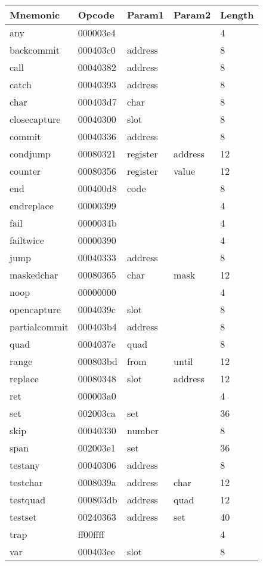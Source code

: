 
\begin{center}
\caption{Naigama Bytecode Instructions}
\label{tab:naig_bytecode}
\begin{longtable}{lllll}
\textbf{Mnemonic} & \textbf{Opcode} & \textbf{Param1} & \textbf{Param2} & \textbf{Length} \\
\endhead
any & 000003e4 &  &   & 4 \\
backcommit & 000403c0 & address &   & 8 \\
call & 00040382 & address &   & 8 \\
catch & 00040393 & address &   & 8 \\
char & 000403d7 & char &   & 8 \\
closecapture & 00040300 & slot &   & 8 \\
commit & 00040336 & address &   & 8 \\
condjump & 00080321 & register & address  & 12 \\
counter & 00080356 & register & value  & 12 \\
end & 000400d8 & code &   & 8 \\
endreplace & 00000399 &  &   & 4 \\
fail & 0000034b &  &   & 4 \\
failtwice & 00000390 &  &   & 4 \\
jump & 00040333 & address &   & 8 \\
maskedchar & 00080365 & char & mask  & 12 \\
noop & 00000000 &  &   & 4 \\
opencapture & 0004039c & slot &   & 8 \\
partialcommit & 000403b4 & address &   & 8 \\
quad & 0004037e & quad &   & 8 \\
range & 000803bd & from & until  & 12 \\
replace & 00080348 & slot & address  & 12 \\
ret & 000003a0 &  &   & 4 \\
set & 002003ca & set &   & 36 \\
skip & 00040330 & number &   & 8 \\
span & 002003e1 & set &   & 36 \\
testany & 00040306 & address &   & 8 \\
testchar & 0008039a & address & char  & 12 \\
testquad & 000803db & address & quad  & 12 \\
testset & 00240363 & address & set  & 40 \\
trap & ff00ffff &  &   & 4 \\
var & 000403ee & slot &   & 8 \\
\end{longtable}
\end{center}
